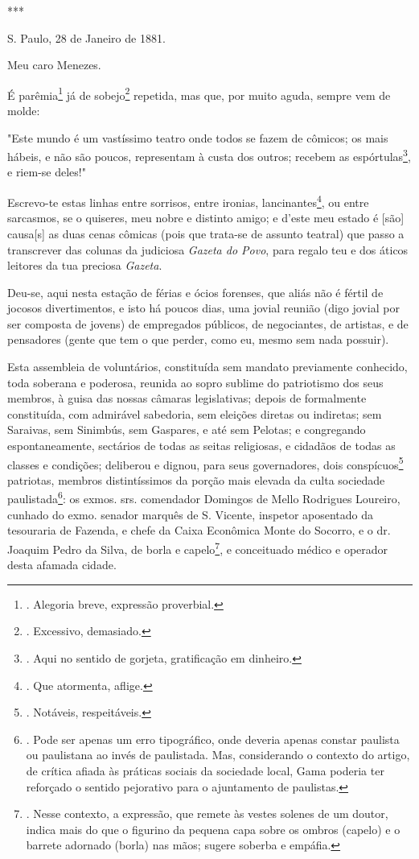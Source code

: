 ***

S. Paulo, 28 de Janeiro de 1881.

Meu caro Menezes.

É parêmia\footnote{. Alegoria breve, expressão proverbial.} já de
sobejo\footnote{. Excessivo, demasiado.} repetida, mas que, por muito
aguda, sempre vem de molde:

"Este mundo é um vastíssimo teatro onde todos se fazem de cômicos; os
mais hábeis, e não são poucos, representam à custa dos outros; recebem
as espórtulas\footnote{. Aqui no sentido de gorjeta, gratificação em
  dinheiro.}, e riem-se deles!"

Escrevo-te estas linhas entre sorrisos, entre ironias,
lancinantes\footnote{. Que atormenta, aflige.}, ou entre sarcasmos, se o
quiseres, meu nobre e distinto amigo; e d'este meu estado é {[}são{]}
causa{[}s{]} as duas cenas cômicas (pois que trata-se de assunto
teatral) que passo a transcrever das colunas da judiciosa \emph{Gazeta
do Povo}, para regalo teu e dos áticos leitores da tua preciosa
\emph{Gazeta}.

Deu-se, aqui nesta estação de férias e ócios forenses, que aliás não é
fértil de jocosos divertimentos, e isto há poucos dias, uma jovial
reunião (digo jovial por ser composta de jovens) de empregados públicos,
de negociantes, de artistas, e de pensadores (gente que tem o que
perder, como eu, mesmo sem nada possuir).

Esta assembleia de voluntários, constituída sem mandato previamente
conhecido, toda soberana e poderosa, reunida ao sopro sublime do
patriotismo dos seus membros, à guisa das nossas câmaras legislativas;
depois de formalmente constituída, com admirável sabedoria, sem eleições
diretas ou indiretas; sem Saraivas, sem Sinimbús, sem Gaspares, e até
sem Pelotas; e congregando espontaneamente, sectários de todas as seitas
religiosas, e cidadãos de todas as classes e condições; deliberou e
dignou, para seus governadores, dois conspícuos\footnote{. Notáveis,
  respeitáveis.} patriotas, membros distintíssimos da porção mais
elevada da culta sociedade paulistada\footnote{. Pode ser apenas um erro
  tipográfico, onde deveria apenas constar paulista ou paulistana ao
  invés de paulistada. Mas, considerando o contexto do artigo, de
  crítica afiada às práticas sociais da sociedade local, Gama poderia
  ter reforçado o sentido pejorativo para o ajuntamento de paulistas.}:
os exmos. srs. comendador Domingos de Mello Rodrigues Loureiro, cunhado
do exmo. senador marquês de S. Vicente, inspetor aposentado da
tesouraria de Fazenda, e chefe da Caixa Econômica Monte do Socorro, e o
dr. Joaquim Pedro da Silva, de borla e capelo\footnote{. Nesse contexto,
  a expressão, que remete às vestes solenes de um doutor, indica mais do
  que o figurino da pequena capa sobre os ombros (capelo) e o barrete
  adornado (borla) nas mãos; sugere soberba e empáfia.}, e conceituado
médico e operador desta afamada cidade.

